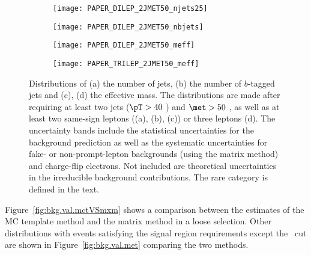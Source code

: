 \begin{figure}[htb!]
\centering
\begin{subfigure}[t]{0.49\textwidth}\texttt{[image: PAPER\_DILEP\_2JMET50\_njets25]}\caption{}\label{fig:VRnj}\end{subfigure}
\begin{subfigure}[t]{0.49\textwidth}\texttt{[image: PAPER\_DILEP\_2JMET50\_nbjets]}\caption{}\label{fig:VRnb}\end{subfigure}
\begin{subfigure}[t]{0.49\textwidth}\texttt{[image: PAPER\_DILEP\_2JMET50\_meff]}\caption{}\label{fig:VRmeff1}\end{subfigure}
\begin{subfigure}[t]{0.49\textwidth}\texttt{[image: PAPER\_TRILEP\_2JMET50\_meff]}\caption{}\label{fig:VRmeff2}\end{subfigure}
\caption{
Distributions of (a) the number of jets, (b) the number of $b$-tagged jets and (c), (d) the effective mass. The distributions are made 
after requiring at least two jets ($\pT>40$ \GeV) and $\met>50$ \GeV, as well as at least two same-sign leptons ((a), (b), (c)) 
or three leptons (d). The uncertainty bands include the statistical uncertainties for the background prediction as well as the 
systematic uncertainties for fake- or non-prompt-lepton backgrounds (using the matrix method) and charge-flip electrons. Not included
are theoretical uncertainties in the irreducible background contributions.
The rare category is defined in the text.}
\label{fig:Bkg_distribs} 
\end{figure} 





Figure~\ref{fig:bkg.val.mctVSmxm} shows a comparison between the estimates of the 
MC template method and the matrix method in a loose selection.
Other \met distributions with events satisfying the signal region 
requirements except the \met\ cut are shown in 
Figure~\ref{fig:bkg.val.met} comparing the two methods. 

